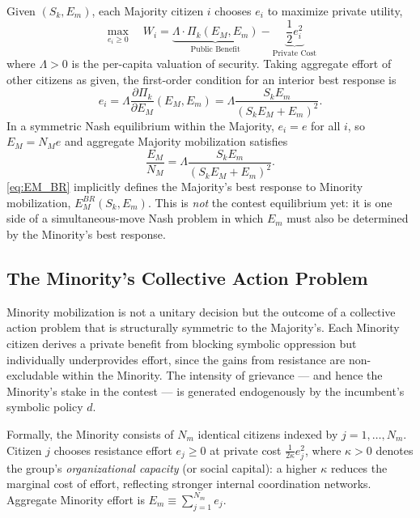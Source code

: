 \documentclass[11pt,twoside]{extarticle}
\begin{document}
Given $(S_k,E_m)$, each Majority citizen $i$ chooses $e_i$ to maximize private utility,
\begin{equation} \label{eq:majority_prob}
    \max_{e_i \geq 0} \quad W_i = \underbrace{\Lambda \cdot \Pi_k(E_{M}, E_m)}_{\text{Public Benefit}} - \underbrace{\frac{1}{2} e_i^2}_{\text{Private Cost}}
\end{equation}
where $\Lambda>0$ is the per-capita valuation of security. Taking aggregate effort of other citizens as given, the first-order condition for an interior best response is
\begin{equation} \label{eq:majority_foc}
e_i = \Lambda \frac{\partial \Pi_k}{\partial E_M}(E_M, E_m)=\Lambda\frac{S_k E_m}{(S_k E_M + E_m)^2}.
\end{equation}
In a symmetric Nash equilibrium within the Majority, $e_i=e$ for all $i$, so $E_M=N_M e$ and aggregate Majority mobilization satisfies
\begin{equation} \label{eq:EM_BR}
\frac{E_M}{N_M}=\Lambda\frac{S_k E_m}{(S_k E_M + E_m)^2}.
\end{equation}
\autoref{eq:EM_BR} implicitly defines the Majority's best response to Minority mobilization, $E_M^{BR}(S_k,E_m)$. This is \emph{not} the contest equilibrium yet: it is one side of a simultaneous-move Nash problem in which $E_m$ must also be determined by the Minority's best response.

\subsection{The Minority's Collective Action Problem}

Minority mobilization is not a unitary decision but the outcome of a collective action problem that is structurally symmetric to the Majority's. Each Minority citizen derives a private benefit from blocking symbolic oppression but individually underprovides effort, since the gains from resistance are non-excludable within the Minority. The intensity of grievance — and hence the Minority's stake in the contest — is generated endogenously by the incumbent's symbolic policy $d$.

Formally, the Minority consists of $N_m$ identical citizens indexed by $j=1,\dots,N_m$. Citizen $j$ chooses resistance effort $e_j\ge 0$ at private cost $\frac{1}{2\kappa}e_j^2$, where $\kappa>0$ denotes the group's \textit{organizational capacity} (or social capital): a higher $\kappa$ reduces the marginal cost of effort, reflecting stronger internal coordination networks. Aggregate Minority effort is $E_m\equiv\sum_{j=1}^{N_m} e_j$.
\end{document}
